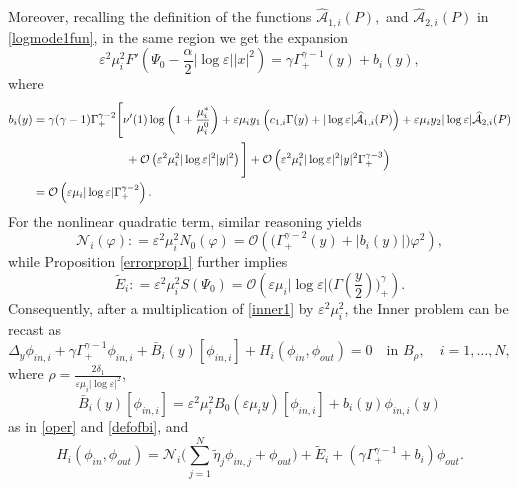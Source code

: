 \documentclass[11pt,reqno,a4paper]{amsart}
\numberwithin{equation}{section}
\newcommand{\defeq}{\mathrel{\mathop:}=}
\newcommand{\ve}{\varepsilon}
\begin{document}
Moreover, recalling the definition of the functions $\widehat{\mathcal{A}}_{1,i}(P),$ and $\widehat{\mathcal{A}}_{2,i}(P)$ in \eqref{logmode1fun}, in the same region we get the expansion \[\ve^2\mu_i^2 F'\left(\Psi_{0}-\frac{\alpha}{2}|\log\ve||x|^2\right)=\gamma\Gamma^{\gamma-1}_{+}(y)+b_i(y),\] 
where
\begin{equation}\label{defofbi}
\begin{aligned}
b_i(y)&=\gamma(\gamma-1)\Gamma^{\gamma-2}_{+}\Bigg[\nu'(1)\log\left(1+\frac{\mu_i^{*}}{\mu_i^{0}}\right)+\ve \mu_i y_1\left(c_{1,i}\Gamma(y)+|\log\ve|\widehat{\mathcal{A}}_{1,i}(P)\right)
+\ve\mu_i y_2|\log\ve|\widehat{\mathcal{A}}_{2,i}(P)\\
&\hspace{28mm}+\mathcal{O}\left(\ve^2\mu_i^2|\log\ve|^2|y|^2\right)\Bigg]+\mathcal{O}\left(\ve^2\mu_i^2|\log\ve|^2|y|^2\Gamma^{\gamma-3}_{+}\right)\\
&=\mathcal{O}\left(\ve\mu_i|\log\ve|\Gamma^{\gamma-2}_{+}\right).
\end{aligned}
\end{equation}
For the nonlinear quadratic term, similar reasoning yields 
\[
\mathcal N_i(\varphi)\defeq \ve^2\mu_i^2 N_0(\varphi)
=\mathcal O\!\left(\bigl(\Gamma_+^{\gamma-2}(y)+|b_i(y)|\bigr)\varphi^2\right),
\]
while Proposition \ref{errorprop1} further implies 
\begin{equation*}
\widetilde{E}_{i}\defeq \ve^2\mu_i^2S(\Psi_0)=\mathcal{O}\left(\ve\mu_i|\log\ve|\Big(\Gamma\left(\frac{y}{2}\right)\Big)^{\gamma}_{+}\right).
\end{equation*}
Consequently, after a multiplication of \eqref{inner1} by $\ve^2\mu_i^2$, the Inner problem can be recast as
\begin{equation}\label{inprobexp}
\Delta_{y}\phi_{in,i}+\gamma\Gamma^{\gamma-1}_{+}\phi_{in,i}+\bar B_i(y)[\phi_{in,i}]+H_i(\phi_{in},\phi_{out})=0 \quad\mbox{in}\,\,B_{\rho}, \quad i=1,\dots,N,
\end{equation}
where $\rho=\frac{2\delta_1}{\ve\mu_i|\log\ve|^2}$, 
\begin{equation}\label{defbarBinner}
\bar{B}_i(y)[\phi_{in,i}]=\ve^2\mu_i^2 B_0(\ve\mu_i y)[\phi_{in,i}]+b_i(y)\phi_{in,i}(y)
\end{equation}
as in \eqref{oper} and \eqref{defofbi}, and
\begin{equation}\label{defHinner}
H_i(\phi_{in},\phi_{out})=\mathcal{N}_i\Big(\sum_{j=1}^{N}\tilde{\eta}_j\phi_{in,j}+\phi_{out}\Big)+\widetilde{E}_i+\left(\gamma\Gamma^{\gamma-1}_{+}+b_i\right)\phi_{out}.
\end{equation}
\end{document}
